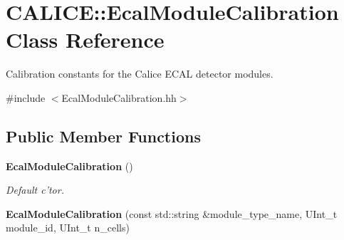 \section{CALICE::EcalModuleCalibration Class Reference}
\label{classCALICE_1_1EcalModuleCalibration}


Calibration constants for the Calice ECAL detector modules.  


{\ttfamily \#include $<$EcalModuleCalibration.hh$>$}\subsection*{Public Member Functions}
\begin{DoxyCompactItemize}
\item 
{\bf EcalModuleCalibration} ()\label{classCALICE_1_1EcalModuleCalibration_ae630cd2d19428408a0318136f4094831}

\begin{DoxyCompactList}\small\item\em Default c'tor. \item\end{DoxyCompactList}\item 
{\bf EcalModuleCalibration} (const std::string \&module\_\-type\_\-name, UInt\_\-t module\_\-id, UInt\_\-t n\_\-cells)\label{classCALICE_1_1EcalModuleCalibration_ac75e6361c5f11223a22cf1da6119b763}


\end{DoxyCompactItemize}
